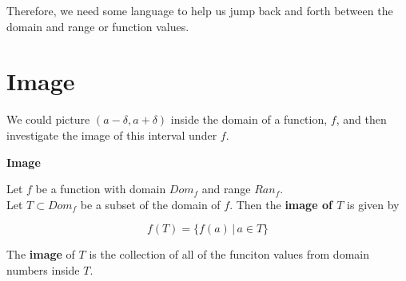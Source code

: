 \documentclass{ximera}
\begin{document}
Therefore, we need some language to help us jump back and forth between the domain and range or function values.





















\section{Image}


We could picture $(a-\delta, a+\delta)$ inside the domain of a function, $f$, and then investigate the image of this interval under $f$.  







\begin{definition} \textbf{\textcolor{green!50!black}{Image}}

Let $f$ be a function with domain $Dom_f$ and range $Ran_f$. \\
Let $T \subset Dom_f$ be a subset of the domain of $f$.  Then the \textbf{image of $T$} is given by

\[       f(T) = \{   f(a)  \, | \, a \in T            \}             \]


The \textbf{image} of $T$ is the collection of all of the funciton values from domain numbers inside $T$.


\end{definition}
\end{document}
